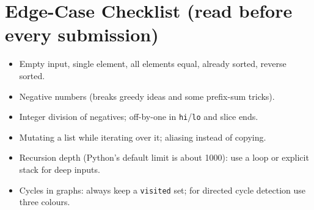 \documentclass[11pt,a4paper]{article}
\newcommand{\py}[1]{\texttt{#1}}
\begin{document}
\section{Edge-Case Checklist (read before every submission)}
\begin{itemize}[leftmargin=*,itemsep=1pt]
\item Empty input, single element, all elements equal, already sorted, reverse sorted.
\item Negative numbers (breaks greedy ideas and some prefix-sum tricks).
\item Integer division of negatives; off-by-one in \py{hi}/\py{lo} and slice ends.
\item Mutating a list while iterating over it; aliasing instead of copying.
\item Recursion depth (Python's default limit is about 1000): use a loop or explicit stack for deep inputs.
\item Cycles in graphs: always keep a \py{visited} set; for directed cycle detection use three colours.
\end{itemize}
\end{document}
